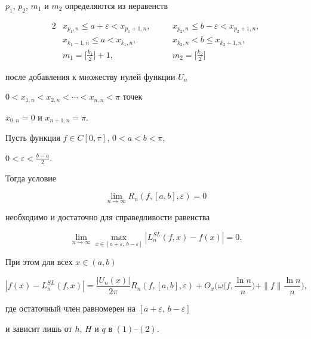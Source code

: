 $p_1$, $p_2$, $m_1$ и $m_2$ определяются из неравенств 


\begin{alignat*}{2} 


& x_{p_1,n}\le a+\varepsilon<x_{p_1+1,n}, &\quad 


& x_{p_2,n}\le b-\varepsilon<x_{p_2+1,n},\\ 


% 


& x_{k_1-1,n}\le a<x_{k_1,n}, &\quad 


& x_{k_2,n}<b\le x_{k_2+1,n},\\ 


% 


& m_1=\bigg[\frac{k_1}{2} \bigg]+1, &\quad 


& m_2=\bigg[\frac{k_2}{2} \bigg] 


\end{alignat*} 


после добавления к множеству нулей функции $U_n$\; 


$0<x_{1,n}<x_{2,n}<\dotsb<x_{n,n}<\pi$ точек 


$x_{0,n}=0$ и $x_{n+1,n}=\pi$. 


 


\begin{thm} 


Пусть функция $f\in C[0,\pi]$, $0<a<b<\pi$, 


$0<\varepsilon<\frac{b-a}{2}$. 


Тогда условие 


$$ 


\lim_{n\to\infty}R_n(f,[a,b],\varepsilon)=0 


$$ 


необходимо и достаточно для справедливости равенства 


\begin{equation} 


\lim_{n\to\infty}\max_{x\in[a+\varepsilon,\,b-\varepsilon]} 


|L^{SL}_n(f,x)-f(x)|=0. 


\end{equation} 


При этом для всех $x\in(a,b)$ 


$$ 


|f(x)-L^{SL}_n(f,x)|= 


\frac{|U_n(x)|}{2\pi}R_n(f,[a,b],\varepsilon)+O_x 


\bigg(\omega\bigg(f,\frac{\ln n}{n}\bigg)+ 


\|f\|\frac{\ln n}{n}\bigg), 


$$ 


где остаточный член равномерен на $[a+\varepsilon,\,b-\varepsilon]$ 


и зависит лишь от $h$, $H$ и $q$ в $(1)$--$(2)$. 


\end{thm} 


